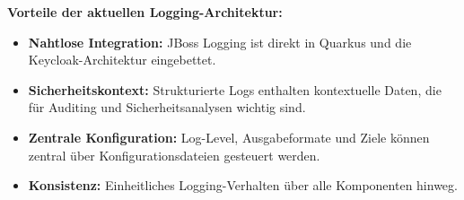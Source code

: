 \documentclass[a4paper,12pt]{article}
\begin{document}
	\vspace{0.5em}
	\textbf{Vorteile der aktuellen Logging-Architektur:}
	\begin{itemize}
		\item \textbf{Nahtlose Integration:} JBoss Logging ist direkt in Quarkus und die Keycloak-Architektur eingebettet.
		\item \textbf{Sicherheitskontext:} Strukturierte Logs enthalten kontextuelle Daten, die für Auditing und Sicherheitsanalysen wichtig sind.
		\item \textbf{Zentrale Konfiguration:} Log-Level, Ausgabeformate und Ziele können zentral über Konfigurationsdateien gesteuert werden.
		\item \textbf{Konsistenz:} Einheitliches Logging-Verhalten über alle Komponenten hinweg.
	\end{itemize}
	
\end{document}
